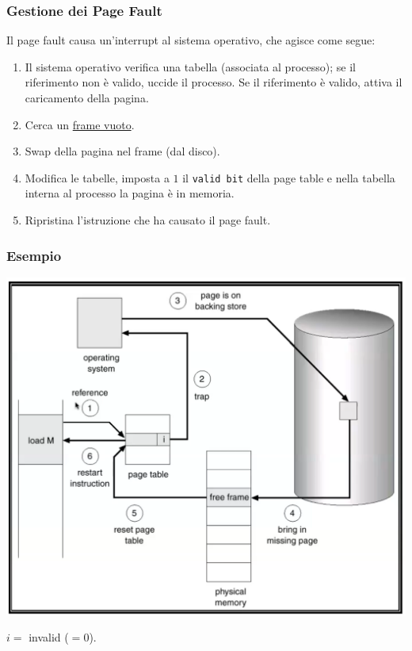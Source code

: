 \documentclass[a4paper,12pt, twoside]{report}
\begin{document}
\subsubsection{Gestione dei Page Fault}
Il page fault causa un'interrupt al sistema operativo, che agisce come segue:
\begin{enumerate}
    \item Il sistema operativo verifica una tabella (associata al processo); se il riferimento non \`e 
        valido, uccide il processo. Se il riferimento \`e valido, attiva il caricamento della pagina.
    \item Cerca un \underline{frame vuoto}. 
    \item Swap della pagina nel frame (dal disco). 
    \item Modifica le tabelle, imposta a $1$ il \texttt{valid bit} della page table e nella tabella 
        interna al processo la pagina \`e in memoria. 
    \item Ripristina l'istruzione che ha causato il page fault. 
\end{enumerate} 
\subsubsection{Esempio}
\begin{center}
    \includegraphics[scale=0.2]{pagefault_manage}

    \tiny{$i =$ invalid ($= 0$).}
\end{center} 
\end{document}

